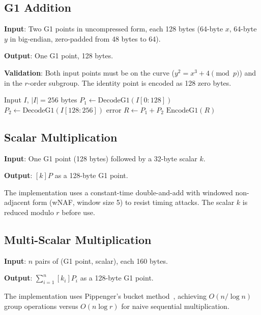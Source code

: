 \documentclass[11pt,a4paper]{article}
\begin{document}
\subsection{G1 Addition}

\textbf{Input}: Two G1 points in uncompressed form, each 128 bytes (64-byte $x$, 64-byte $y$
in big-endian, zero-padded from 48 bytes to 64).

\textbf{Output}: One G1 point, 128 bytes.

\textbf{Validation}: Both input points must be on the curve ($y^2 = x^3 + 4 \pmod{p}$) and
in the $r$-order subgroup. The identity point is encoded as 128 zero bytes.

\begin{algorithm}[H]
\caption{G1Add precompile}
\begin{algorithmic}[1]
\Require Input $I$, $|I| = 256$ bytes
\State $P_1 \gets \text{DecodeG1}(I[0{:}128])$
\State $P_2 \gets \text{DecodeG1}(I[128{:}256])$
 \Return error \EndIf
\State $R \gets P_1 + P_2$ 
\State \Return $\text{EncodeG1}(R)$
\end{algorithmic}
\end{algorithm}

\subsection{Scalar Multiplication}

\textbf{Input}: One G1 point (128 bytes) followed by a 32-byte scalar $k$.

\textbf{Output}: $[k]P$ as a 128-byte G1 point.

The implementation uses a constant-time double-and-add with windowed non-adjacent form
(wNAF, window size 5) to resist timing attacks. The scalar $k$ is reduced modulo $r$
before use.

\subsection{Multi-Scalar Multiplication}

\textbf{Input}: $n$ pairs of (G1 point, scalar), each 160 bytes.

\textbf{Output}: $\sum_{i=1}^{n} [k_i] P_i$ as a 128-byte G1 point.

The implementation uses Pippenger's bucket method~\cite{pippenger}, achieving
$O(n / \log n)$ group operations versus $O(n \log r)$ for naive sequential multiplication.
\end{document}
